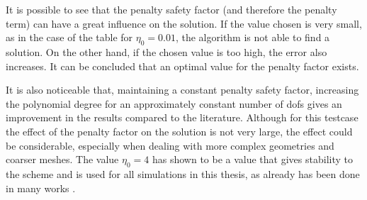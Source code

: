 It is possible to see that the penalty safety factor (and therefore the penalty term) can have a great influence on the solution. If the value chosen is very small, as in the case of the table for $\eta_0 = 0.01$, the algorithm is not able to find a solution. On the other hand, if the chosen value is too high, the error also increases. It can be concluded that an optimal value for the penalty factor exists.

It is also noticeable that, maintaining a constant penalty safety factor, increasing the polynomial degree for an approximately constant number of dofs gives an improvement in the results compared to the literature. Although for this testcase the effect of the penalty factor on the solution is not very large, the effect could be considerable, especially when dealing with more complex geometries and coarser meshes. The value $\eta_0 = 4$ has shown to be a value that gives stability to the scheme and is used for all simulations in this thesis, as already has been done in many works \parencite{krauseIncompressibleImmersedBoundary2017,kummerExtendedDiscontinuousGalerkin2017,smudamartinDirectNumericalSimulation2021}.
 

